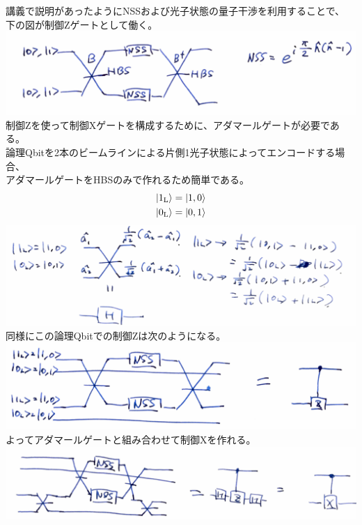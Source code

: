 \documentclass{jsarticle}
\newcommand{\mr}[1]{\mathrm{#1}}
\begin{document}
講義で説明があったようにNSSおよび光子状態の量子干渉を利用することで、\\
下の図が制御Zゲートとして働く。\\
\includegraphics[width=0.9\linewidth]{./graphics/nss.pdf}\\
制御Zを使って制御Xゲートを構成するために、アダマールゲートが必要である。\\
論理Qbitを2本のビームラインによる片側1光子状態によってエンコードする場合、\\
アダマールゲートをHBSのみで作れるため簡単である。
\begin{gather*}
	\ket{1_\mr{L}} = \ket{1,0}\\
	\ket{0_\mr{L}} = \ket{0,1}
\end{gather*}
\includegraphics[width=0.9\linewidth]{./graphics/h.pdf}\\
同様にこの論理Qbitでの制御Zは次のようになる。\\
\includegraphics[width=0.9\linewidth]{./graphics/cz.pdf}\\
よってアダマールゲートと組み合わせて制御Xを作れる。\\
\includegraphics[width=0.9\linewidth]{./graphics/cx.pdf}\\
\end{document}
